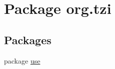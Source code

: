 \hypertarget{namespaceorg_1_1tzi}{\section{Package org.\-tzi}
\label{namespaceorg_1_1tzi}
}
\subsection*{Packages}
\begin{DoxyCompactItemize}
\item 
package \hyperlink{namespaceorg_1_1tzi_1_1use}{use}
\end{DoxyCompactItemize}
